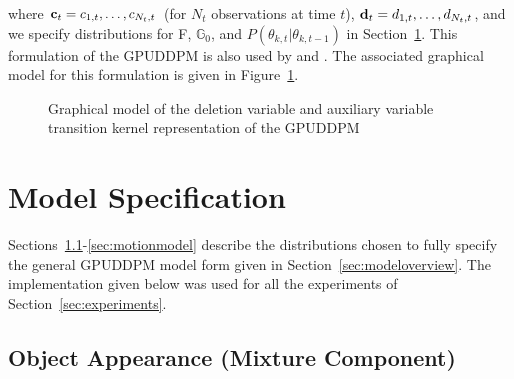 \documentclass[twocolumn, final]{svjour3}
\begin{document}
where $\bold{c}_{t} = c_{1,t}, \ldots, c_{N_{t}, t}$ (for $N_{t}$ observations at time $t$), $\bold{d}_{t} = d_{1,t}, \ldots, d_{N_{t}, t}$, and we specify distributions for F, $\mathbb{G}_{0}$, and $P(\theta_{k, t} | \theta_{k, t-1})$ in Section~\ref{sec:modelspecification}. This formulation of the GPUDDPM is also used by \cite{gasthaus_thesis} and \cite{caron_2007}. The associated graphical model for this formulation is given in Figure~\ref{fig:gpuddpm_gm_2}.
\begin{figure}[h]
        \caption{Graphical model of the deletion variable and auxiliary variable transition kernel representation of the GPUDDPM}
        \label{fig:gpuddpm_gm_2}
\end{figure}




\section{Model Specification}
\label{sec:modelspecification}

Sections~\ref{sec:objectappearance}-\ref{sec:motionmodel} describe the distributions chosen to fully specify the general GPUDDPM model form given in Section~\ref{sec:modeloverview}. The implementation given below was used for all the experiments of Section~\ref{sec:experiments}.


\subsection{Object Appearance (Mixture Component)}
\label{sec:objectappearance}
\end{document}
